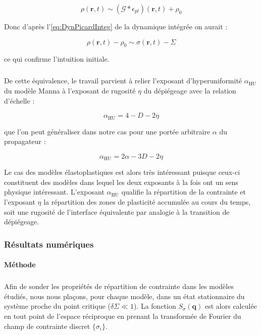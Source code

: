 \begin{equation}
	\rho (\mathbf{r},t) \sim \left(\mathcal{G}\ast\epsilon_{pl}\right)(\mathbf{r},t)+ \rho_0
\end{equation}

\noindent Donc d'après l'\autoref{eq:DynPicardInteg} de la dynamique intégrée on aurait :

\begin{equation}
	\rho (\mathbf{r},t) - \rho_0 \sim \sigma (\mathbf{r},t)- \Sigma
\end{equation}

\noindent ce qui confirme l'intuition initiale.

\subparagraph{}De cette équivalence, le travail \cite{wiese_hyperuniformity_2024} parvient à relier l'exposant d'hyperuniformité $\alpha_\text{HU}$ du modèle Manna à l'exposant de rugosité $\eta$ du dépiégeage avec la relation d'échelle :

\begin{equation}
	\alpha_\text{HU} = 4 - D - 2\eta
\end{equation}

\noindent que l'on peut généraliser dans notre cas pour une portée arbitraire $\alpha$ du propagateur :

\begin{equation}
	\alpha_\text{HU} = 2\alpha - 3D - 2\eta
	\label{eq:scalingHULP}
\end{equation}

\noindent Le cas des modèles élastoplastiques est alors très intéressant puisque ceux-ci constituent des modèles dans lequel les deux exposants à la fois ont un sens physique intéressant. L'exposant $\alpha_\text{HU}$ qualifie la répartition de la contrainte et l'exposant $\eta$ la répartition des zones de plasticité accumulée au cours du temps, soit une rugosité de l'interface équivalente par analogie à la transition de dépiégeage.

\subsubsection{Résultats numériques}

\label{sec:HUEPM}

\paragraph{Méthode}

\subparagraph{}Afin de sonder les propriétés de répartition de contrainte dans les modèles étudiés, nous nous plaçons, pour chaque modèle, dans un état stationnaire du système proche du point critique ($\delta\Sigma \ll 1$). La fonction $S_\sigma(\mathbf{q})$ est alors calculée en tout point de l'espace réciproque en prenant la transformée de Fourier du champ de contrainte discret $\{\sigma_i\}$.

